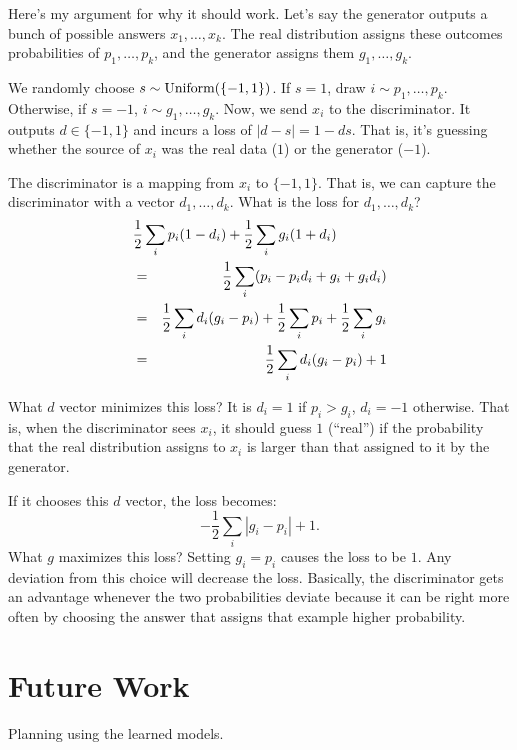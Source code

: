 \documentclass[letterpaper]{article} %
\begin{document}
Here's my argument for why it should work. Let's say the generator outputs a bunch of possible answers $x_1,\ldots,x_k$. The real distribution assigns these outcomes probabilities of $p_1,\ldots,p_k$, and the generator assigns them $g_1,\ldots,g_k$.

We randomly choose $s \sim \mbox{\rm Uniform}(\{-1,1\})$. If $s = 1$, draw $i \sim p_1,\ldots,p_k$. Otherwise, if $s = -1$, $i \sim g_1,\ldots,g_k$. Now, we send $x_i$ to the discriminator. It outputs $d \in \{-1,1\}$ and incurs a loss of $|d-s| = 1-ds$. That is, it's guessing whether the source of $x_i$ was the real data ($1$) or the generator ($-1$).

The discriminator is a mapping from $x_i$ to $\{-1,1\}$. That is, we can capture the discriminator with a vector $d_1,\ldots,d_k$. What is the loss for $d_1,\ldots,d_k$?
\begin{eqnarray*}
\lefteqn{\frac{1}{2} \sum_i p_i (1-d_i) + \frac{1}{2} \sum_i g_i (1+d_i)}\\
&=& \frac{1}{2} \sum_i (p_i - p_i d_i + g_i + g_i d_i)\\
&=& \frac{1}{2} \sum_i d_i (g_i-p_i) + \frac{1}{2} \sum_i p_i + \frac{1}{2} \sum_i g_i \\
&=& \frac{1}{2} \sum_i d_i (g_i-p_i) + 1
\end{eqnarray*}

What $d$ vector minimizes this loss? It is $d_i = 1$ if $p_i>g_i$, $d_i = -1$ otherwise. That is, when the discriminator sees $x_i$, it should guess $1$ (``real'') if the probability that the real distribution assigns to $x_i$ is larger than that assigned to it by the generator.

If it chooses this $d$ vector, the loss becomes:
$$
-\frac{1}{2} \sum_i |g_i-p_i| + 1.
$$
What $g$ maximizes this loss? Setting $g_i=p_i$ causes the loss to be $1$. Any deviation from this choice will decrease the loss. Basically, the discriminator gets an advantage whenever the two probabilities deviate because it can be right more often by choosing the answer that assigns that example higher probability.

\section{Future Work}

Planning using the learned models.




\end{document}
